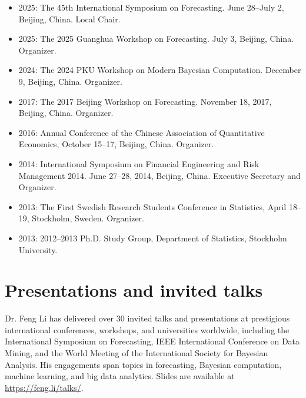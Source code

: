 \documentclass[twoside,a4paper]{article}
\begin{document}
\begin{itemize}

\item 2025: The 45th International Symposium on Forecasting. June 28--July 2, Beijing, China. Local Chair.
\item 2025: The 2025 Guanghua Workshop on Forecasting. July 3, Beijing, China. Organizer.
\item 2024: The 2024 PKU Workshop on Modern Bayesian Computation. December 9, Beijing, China. Organizer.
\item 2017: The 2017 Beijing Workshop on Forecasting. November 18, 2017, Beijing, China. Organizer.
\item 2016: Annual Conference of the Chinese Association of Quantitative Economics, October 15--17, Beijing, China. Organizer.
\item 2014: International Symposium on Financial Engineering and Risk Management 2014. June 27--28, 2014, Beijing, China. Executive Secretary and Organizer.
\item 2013: The First Swedish Research Students Conference in Statistics, April 18--19, Stockholm, Sweden. Organizer.
\item 2013: 2012--2013 Ph.D. Study Group, Department of Statistics, Stockholm University.
\end{itemize}

\section{Presentations and invited talks}

Dr. Feng Li has delivered over 30 invited talks and presentations at prestigious international conferences, workshops, and universities worldwide, including the International Symposium on Forecasting, IEEE International Conference on Data Mining, and the World Meeting of the International Society for Bayesian Analysis. His engagements span topics in forecasting, Bayesian computation, machine learning, and big data analytics. Slides are available at \url{https://feng.li/talks/}.
\end{document}
